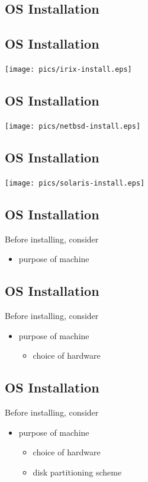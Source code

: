 \documentclass[xga]{xdvislides}
\begin{document}
\subsection{OS Installation}

\subsection{OS Installation}
\begin{center}
	\texttt{[image: pics/irix-install.eps]}
\end{center}

\subsection{OS Installation}
\begin{center}
	\texttt{[image: pics/netbsd-install.eps]}
\end{center}

\subsection{OS Installation}
\begin{center}
	\texttt{[image: pics/solaris-install.eps]}
\end{center}


\subsection{OS Installation}
Before installing, consider
\begin{itemize}
	\item purpose of machine
\end{itemize}

\subsection{OS Installation}
Before installing, consider
\begin{itemize}
	\item purpose of machine
		\begin{itemize}
			\item choice of hardware
		\end{itemize}
\end{itemize}

\subsection{OS Installation}
Before installing, consider
\begin{itemize}
	\item purpose of machine
		\begin{itemize}
			\item choice of hardware
			\item disk partitioning scheme
		\end{itemize}
\end{itemize}
\end{document}
